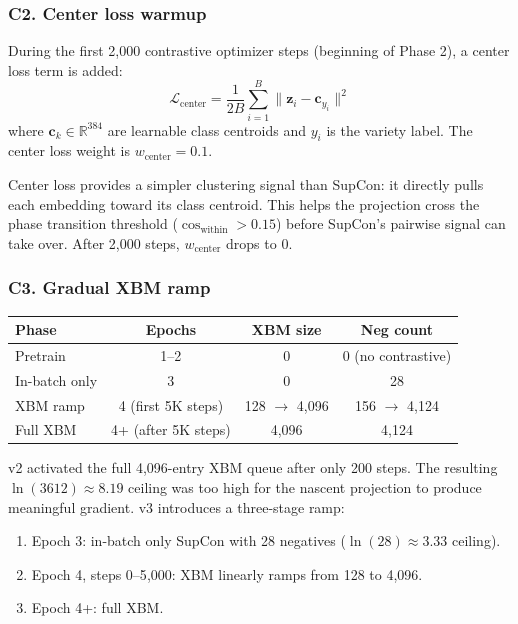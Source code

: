 \documentclass[11pt,a4paper]{article}
\newcommand{\loss}{\mathcal{L}}
\newcommand{\R}{\mathbb{R}}
\begin{document}
\subsubsection{C2. Center loss warmup}

During the first 2{,}000 contrastive optimizer steps (beginning of Phase 2),
a center loss term is added:
\[
\loss_{\text{center}} = \frac{1}{2B} \sum_{i=1}^{B}
\| \mathbf{z}_i - \mathbf{c}_{y_i} \|^2
\]
where $\mathbf{c}_k \in \R^{384}$ are learnable class centroids and
$y_i$ is the variety label. The center loss weight is $w_{\text{center}} = 0.1$.

Center loss provides a simpler clustering signal than SupCon: it directly
pulls each embedding toward its class centroid. This helps the projection
cross the phase transition threshold ($\cos_{\text{within}} > 0.15$) before
SupCon's pairwise signal can take over. After 2{,}000 steps,
$w_{\text{center}}$ drops to 0.

\subsubsection{C3. Gradual XBM ramp}

\begin{center}
\begin{tabular}{lccc}
\toprule
\textbf{Phase} & \textbf{Epochs} & \textbf{XBM size} & \textbf{Neg count} \\
\midrule
Pretrain & 1--2 & 0 & 0 (no contrastive) \\
In-batch only & 3 & 0 & 28 \\
XBM ramp & 4 (first 5K steps) & 128 $\to$ 4{,}096 & 156 $\to$ 4{,}124 \\
Full XBM & 4+ (after 5K steps) & 4{,}096 & 4{,}124 \\
\bottomrule
\end{tabular}
\end{center}

v2 activated the full 4{,}096-entry XBM queue after only 200 steps. The
resulting $\ln(3612) \approx 8.19$ ceiling was too high for the nascent
projection to produce meaningful gradient. v3 introduces a three-stage
ramp:
\begin{enumerate}
\item Epoch 3: in-batch only SupCon with 28 negatives
($\ln(28) \approx 3.33$ ceiling).
\item Epoch 4, steps 0--5{,}000: XBM linearly ramps from 128 to 4{,}096.
\item Epoch 4+: full XBM.
\end{enumerate}
\end{document}
